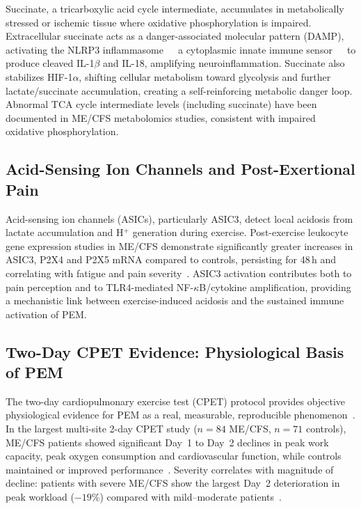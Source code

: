 Succinate, a tricarboxylic acid cycle intermediate, accumulates in metabolically stressed or ischemic tissue where oxidative phosphorylation is impaired. Extracellular succinate acts as a danger-associated molecular pattern (DAMP), activating the NLRP3 inflammasome~~~a cytoplasmic innate immune sensor~~~to produce cleaved IL-1$\beta$ and IL-18, amplifying neuroinflammation. Succinate also stabilizes HIF-1$\alpha$, shifting cellular metabolism toward glycolysis and further lactate/succinate accumulation, creating a self-reinforcing metabolic danger loop. Abnormal TCA cycle intermediate levels (including succinate) have been documented in ME/CFS metabolomics studies, consistent with impaired oxidative phosphorylation.

\subsection{Acid-Sensing Ion Channels and Post-Exertional Pain}

Acid-sensing ion channels (ASICs), particularly ASIC3, detect local acidosis from lactate accumulation and H$^+$ generation during exercise. Post-exercise leukocyte gene expression studies in ME/CFS demonstrate significantly greater increases in ASIC3, P2X4 and P2X5 mRNA compared to controls, persisting for 48\,h and correlating with fatigue and pain severity~\cite{Nijs2012painCFS}. ASIC3 activation contributes both to pain perception and to TLR4-mediated NF-$\kappa$B/cytokine amplification, providing a mechanistic link between exercise-induced acidosis and the sustained immune activation of PEM.

\subsection{Two-Day CPET Evidence: Physiological Basis of PEM}

The two-day cardiopulmonary exercise test (CPET) protocol provides objective physiological evidence for PEM as a real, measurable, reproducible phenomenon~\cite{Vink2015}. In the largest multi-site 2-day CPET study ($n = 84$ ME/CFS, $n = 71$ controls), ME/CFS patients showed significant Day~1 to Day~2 declines in peak work capacity, peak oxygen consumption and cardiovascular function, while controls maintained or improved performance~\cite{keller2024cpet}. Severity correlates with magnitude of decline: patients with severe ME/CFS show the largest Day~2 deterioration in peak workload ($-19\%$) compared with mild--moderate patients~\cite{VanCampen2020SeverityCPET}.

